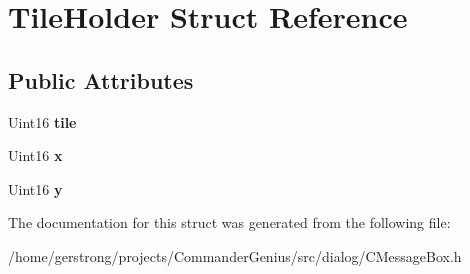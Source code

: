 \hypertarget{struct_tile_holder}{
\section{TileHolder Struct Reference}
\label{struct_tile_holder}
}
\subsection*{Public Attributes}
\begin{DoxyCompactItemize}
\item 
\hypertarget{struct_tile_holder_a3291acc680486730c8e959e96f270032}{
Uint16 {\bfseries tile}}
\label{struct_tile_holder_a3291acc680486730c8e959e96f270032}

\item 
\hypertarget{struct_tile_holder_a92965f4fa8a5a29941ae5b71a7a81bfd}{
Uint16 {\bfseries x}}
\label{struct_tile_holder_a92965f4fa8a5a29941ae5b71a7a81bfd}

\item 
\hypertarget{struct_tile_holder_a22cfe459de0ad9ca1efc0f377f41d619}{
Uint16 {\bfseries y}}
\label{struct_tile_holder_a22cfe459de0ad9ca1efc0f377f41d619}

\end{DoxyCompactItemize}


The documentation for this struct was generated from the following file:\begin{DoxyCompactItemize}
\item 
/home/gerstrong/projects/CommanderGenius/src/dialog/CMessageBox.h\end{DoxyCompactItemize}
